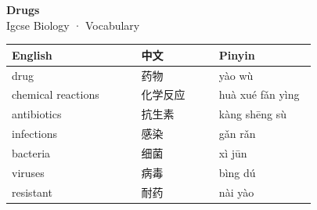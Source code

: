 \documentclass[11pt]{article}
\begin{document}
\begin{center}
  {\LARGE\bfseries Drugs}\\[0.35em]
  {\large Igcse Biology · Vocabulary}
\end{center}
\vspace{0.6em}

\begin{longtable}{@{}p{0.40\linewidth}p{0.24\linewidth}p{0.30\linewidth}@{}}
\toprule
\textbf{English} & \textbf{中文} & \textbf{Pinyin} \\
\midrule
\endhead
\bottomrule
\endlastfoot
drug & 药物 & yào wù \\
chemical reactions & 化学反应 & huà xué fǎn yìng \\
antibiotics & 抗生素 & kàng shēng sù \\
infections & 感染 & gǎn rǎn \\
bacteria & 细菌 & xì jūn \\
viruses & 病毒 & bìng dú \\
resistant & 耐药 & nài yào \\
\end{longtable}
\end{document}
